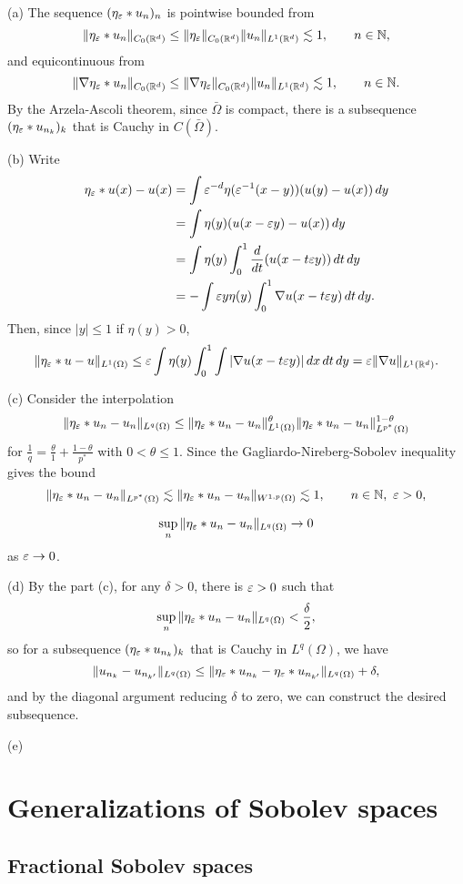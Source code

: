 \documentclass{../../large}
\begin{document}
\begin{pf}
(a)
The sequence $(\eta_\varepsilon*u_n)_n$ is pointwise bounded from
\[\|\eta_\varepsilon*u_n\|_{C_0(\mathbb{R}^d)}\le\|\eta_\varepsilon\|_{C_0(\mathbb{R}^d)}\|u_n\|_{L^1(\mathbb{R}^d)}\lesssim1,\qquad n\in\mathbb{N},\]
and equicontinuous from
\[\|\nabla\eta_\varepsilon*u_n\|_{C_0(\mathbb{R}^d)}\le\|\nabla\eta_\varepsilon\|_{C_0(\mathbb{R}^d)}\|u_n\|_{L^1(\mathbb{R}^d)}\lesssim1,\qquad n\in\mathbb{N}.\]
By the Arzela-Ascoli theorem, since $\bar\Omega$ is compact, there is a subsequence $(\eta_\varepsilon*u_{n_k})_k$ that is Cauchy in $C(\bar\Omega)$.

(b)
Write
\begin{align*}
\eta_\e*u(x)-u(x)
&=\int\e^{-d}\eta(\e^{-1}(x-y))(u(y)-u(x))\,dy\\
&=\int\eta(y)(u(x-\e y)-u(x))\,dy\\
&=\int\eta(y)\int_0^1\dd{t}(u(x-t\e y))\,dt\,dy\\
&=-\int\e y\eta(y)\int_0^1\nabla u(x-t\e y)\,dt\,dy.
\end{align*}
Then, since $|y|\le1$ if $\eta(y)>0$,
\[\|\eta_\varepsilon*u-u\|_{L^1(\Omega)}\le\varepsilon\int\eta(y)\int_0^1\int|\nabla u(x-t\varepsilon y)|\,dx\,dt\,dy=\varepsilon\|\nabla u\|_{L^1(\mathbb{R}^d)}.\]

(c)
Consider the interpolation
\[\|\eta_\varepsilon*u_n-u_n\|_{L^q(\Omega)}\le\|\eta_\varepsilon*u_n-u_n\|_{L^1(\Omega)}^\theta\|\eta_\varepsilon*u_n-u_n\|_{L^{p^*}(\Omega)}^{1-\theta}\]
for $\frac1q=\frac\theta1+\frac{1-\theta}{p^*}$ with $0<\theta\le1$.
Since the Gagliardo-Nireberg-Sobolev inequality gives the bound
\[\|\eta_\varepsilon*u_n-u_n\|_{L^{p^*}(\Omega)}\lesssim\|\eta_\varepsilon*u_n-u_n\|_{W^{1,p}(\Omega)}\lesssim1,\qquad n\in\mathbb{N},\ \varepsilon>0,\]

\[\sup_n\|\eta_\varepsilon*u_n-u_n\|_{L^q(\Omega)}\to0\]
as $\varepsilon\to0$.

(d)
By the part (c), for any $\delta>0$, there is $\varepsilon>0$ such that
\[\sup_n\|\eta_\varepsilon*u_n-u_n\|_{L^q(\Omega)}<\frac\delta2,\]
so for a subsequence $(\eta_\varepsilon*u_{n_k})_k$ that is Cauchy in $L^q(\Omega)$, we have
\[\|u_{n_k}-u_{n_{k'}}\|_{L^q(\Omega)}\le\|\eta_\varepsilon*u_{n_k}-\eta_\varepsilon*u_{n_{k'}}\|_{L^q(\Omega)}+\delta,\]
and by the diagonal argument reducing $\delta$ to zero, we can construct the desired subsequence.

(e)
\end{pf}




\chapter{Generalizations of Sobolev spaces}
\section{Fractional Sobolev spaces}
\end{document}
